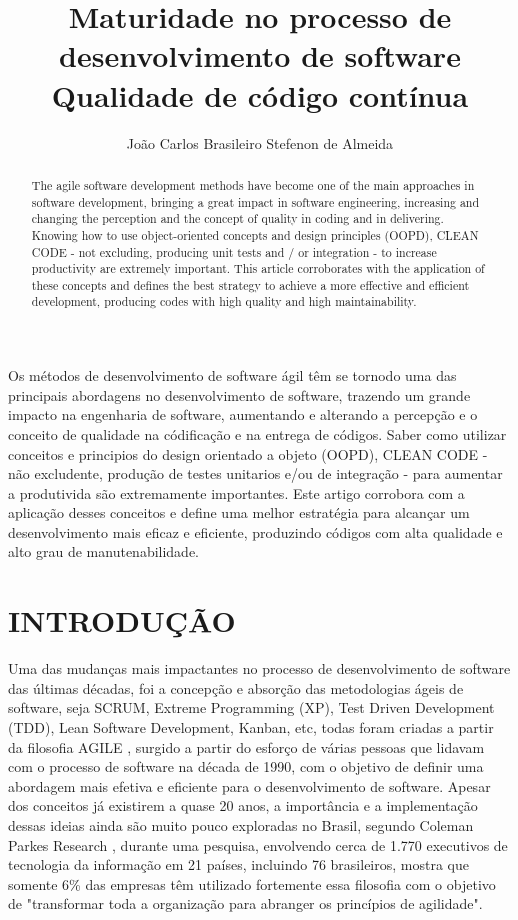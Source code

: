 \documentclass[12pt]{article}
\title{Maturidade no processo de desenvolvimento de software\\ Qualidade de código contínua }
\author{João Carlos Brasileiro Stefenon de Almeida\inst{1}}
\begin{document}
 


\maketitle

  
\begin{resumo} 
Os métodos de desenvolvimento de software ágil têm se tornodo uma das principais abordagens no desenvolvimento de software, trazendo um grande impacto na engenharia de software, aumentando e alterando a percepção e o conceito de qualidade na códificação e na entrega de códigos.
Saber como utilizar conceitos e principios do design orientado a objeto (OOPD), CLEAN CODE - não excludente, produção de testes unitarios e/ou de integração - para aumentar a produtivida são extremamente importantes.
Este artigo corrobora com a aplicação desses conceitos e define uma melhor estratégia para alcançar um desenvolvimento mais eficaz e eficiente, produzindo códigos com alta qualidade e alto grau de manutenabilidade.
\end{resumo}


\begin{abstract}
The agile software development methods have become one of the main approaches in software development, bringing a great impact in software engineering, increasing and changing the perception and the concept of quality in coding and in delivering.
Knowing how to use object-oriented concepts and design principles (OOPD), CLEAN CODE - not excluding, producing unit tests and / or integration - to increase productivity are extremely important.
This article corroborates with the application of these concepts and defines the best strategy to achieve a more effective and efficient development, producing codes with high quality and high maintainability.
\end{abstract}



\part{INTRODUÇÃO}

 Uma das mudanças mais impactantes no processo de desenvolvimento de software das últimas décadas, foi a concepção e absorção das metodologias ágeis de software, seja SCRUM, Extreme Programming (XP), Test Driven Development (TDD), Lean Software Development, Kanban, etc, todas foram criadas a partir da filosofia AGILE \cite{MANISFESTOAGILE}, surgido a partir do esforço de várias pessoas que lidavam com o processo de software na década de 1990, com o objetivo de definir uma abordagem mais efetiva e eficiente para o desenvolvimento de software. Apesar dos conceitos já existirem a quase 20 anos, a importância e a implementação dessas ideias ainda são muito pouco exploradas no Brasil, segundo Coleman Parkes Research \cite{COLEMANPARKES_AGILE_2017}, durante uma pesquisa, envolvendo cerca de 1.770 executivos de tecnologia da informação em 21 países, incluindo 76 brasileiros, mostra que somente 6\% das empresas têm utilizado fortemente essa filosofia com o objetivo de "transformar toda a organização para abranger os princípios de agilidade".
\end{document}
